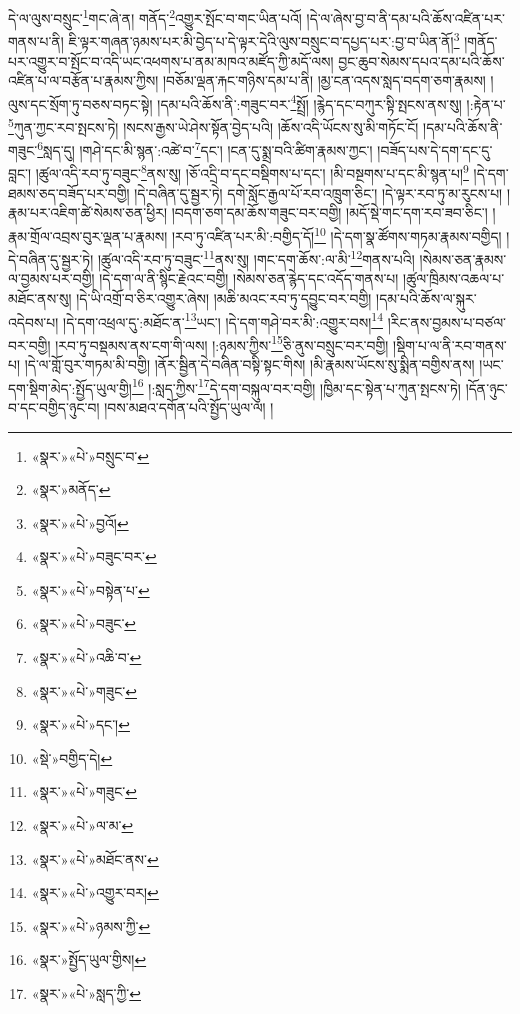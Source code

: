 དེ་ལ་ལུས་བསྲུང་\footnote{«སྣར་»«པེ་»བསྲུང་བ་}གང་ཞེ་ན། གནོད་\footnote{«སྣར་»མནོད་}འགྱུར་སྤོང་བ་གང་ཡིན་པའོ། །དེ་ལ་ཞེས་བྱ་བ་ནི་དམ་པའི་ཆོས་འཛིན་པར་གནས་པ་ནི། ཇི་ལྟར་གཞན་ཉམས་པར་མི་བྱེད་པ་དེ་ལྟར་དེའི་ལུས་བསྲུང་བ་དཔྱད་པར་:བྱ་བ་ཡིན་ནོ།\footnote{«སྣར་»«པེ་»བྱའོ།} །གནོད་པར་འགྱུར་བ་སྤོང་བ་འདི་ཡང་འཕགས་པ་ནམ་མཁའ་མཛོད་ཀྱི་མདོ་ལས། བྱང་ཆུབ་སེམས་དཔའ་དམ་པའི་ཆོས་འཛིན་པ་ལ་བརྩོན་པ་རྣམས་ཀྱིས། །བཅོམ་ལྡན་རྐང་གཉིས་དམ་པ་ནི། །མྱ་ངན་འདས་སླད་བདག་ཅག་རྣམས། །ལུས་དང་སྲོག་ཏུ་བཅས་བཏང་སྟེ། །དམ་པའི་ཆོས་ནི་:གཟུང་བར་\footnote{«སྣར་»«པེ་»བཟུང་བར་}སྤྲོ། །རྙེད་དང་བཀུར་སྟི་སྤངས་ནས་སུ། །:རྟེན་པ་\footnote{«སྣར་»«པེ་»བསྟེན་པ་}ཀུན་ཀྱང་རབ་སྤངས་ཏེ། །སངས་རྒྱས་ཡེ་ཤེས་སྟོན་བྱེད་པའི། །ཆོས་འདི་ཡོངས་སུ་མི་གཏོང་ངོ། །དམ་པའི་ཆོས་ནི་གཟུང་\footnote{«སྣར་»«པེ་»བཟུང་}སླད་དུ། །གཤེ་དང་མི་སྙན་:འཚེ་བ་\footnote{«སྣར་»«པེ་»འཆི་བ་}དང་། །ངན་དུ་སྨྲ་བའི་ཚིག་རྣམས་ཀྱང་། །བཟོད་པས་དེ་དག་དང་དུ་བླང་། །ཚུལ་འདི་རབ་ཏུ་བཟུང་\footnote{«སྣར་»«པེ་»གཟུང་}ནས་སུ། །ཅོ་འདྲི་བ་དང་བསྡིགས་པ་དང་། །མི་བསྔགས་པ་དང་མི་སྙན་པ།\footnote{«སྣར་»«པེ་»དང་།} །དེ་དག་ཐམས་ཅད་བཟོད་པར་བགྱི། །དེ་བཞིན་དུ་སྦྱར་ཏེ། དགེ་སློང་རྒྱལ་པོ་རབ་འཁྲུག་ཅིང་། །དེ་ལྟར་རབ་ཏུ་མ་རུངས་པ། །རྣམ་པར་འཇིག་ཚེ་སེམས་ཅན་ཕྱིར། །བདག་ཅག་དམ་ཆོས་གཟུང་བར་བགྱི། །མདོ་སྡེ་གང་དག་རབ་ཟབ་ཅིང་། །རྣམ་གྲོལ་འབྲས་བུར་ལྡན་པ་རྣམས། །རབ་ཏུ་འཛིན་པར་མི་:བགྱིད་དོ།\footnote{«སྡེ་»བགྱིད་དེ།} །དེ་དག་སྣ་ཚོགས་གཏམ་རྣམས་བགྱིད། །དེ་བཞིན་དུ་སྦྱར་ཏེ། །ཚུལ་འདི་རབ་ཏུ་བཟུང་\footnote{«སྣར་»«པེ་»གཟུང་}ནས་སུ། །གང་དག་ཆོས་:ལ་མི་\footnote{«སྣར་»«པེ་»ལ་མ་}གནས་པའི། །སེམས་ཅན་རྣམས་ལ་བྱམས་པར་བགྱི། །དེ་དག་ལ་ནི་སྙིང་རྗེའང་བགྱི། །སེམས་ཅན་རྙེད་དང་འདོད་གནས་པ། །ཚུལ་ཁྲིམས་འཆལ་པ་མཐོང་ནས་སུ། །དེ་ཡི་འགྲོ་བ་ཅིར་འགྱུར་ཞེས། །མཆི་མའང་རབ་ཏུ་དབྱུང་བར་བགྱི། །དམ་པའི་ཆོས་ལ་སྐུར་འདེབས་པ། །དེ་དག་འཕྲལ་དུ་:མཐོང་ན་\footnote{«སྣར་»«པེ་»མཐོང་ནས་}ཡང་། །དེ་དག་གཤེ་བར་མི་:འགྱུར་བས།\footnote{«སྣར་»«པེ་»འགྱུར་བར།} །རིང་ནས་བྱམས་པ་བཙལ་བར་བགྱི། །རབ་ཏུ་བསྡམས་ནས་ངག་གི་ལས། །:ཉམས་ཀྱིས་\footnote{«སྣར་»«པེ་»ཉམས་ཀྱི་}ཅི་ནུས་བསྲུང་བར་བགྱི། །སྡིག་པ་ལ་ནི་རབ་གནས་པ། །དེ་ལ་གློ་བུར་གཏམ་མི་བགྱི། །ནོར་སྦྱིན་དེ་བཞིན་བསྟི་སྟང་གིས། །མི་རྣམས་ཡོངས་སུ་སྨིན་བགྱིས་ནས། །ཡང་དག་སྡིག་མེད་:སྤྱོད་ཡུལ་གྱི།\footnote{«སྣར་»སྤྱོད་ཡུལ་གྱིས།} །:སླད་ཀྱིས་\footnote{«སྣར་»«པེ་»སླད་ཀྱི་}དེ་དག་བསྐུལ་བར་བགྱི། །ཁྱིམ་དང་སྟེན་པ་ཀུན་སྤངས་ཏེ། །དོན་ཉུང་བ་དང་བགྱིད་ཉུང་བ། །བས་མཐའ་དགོན་པའི་སྤྱོད་ཡུལ་ལ། །
